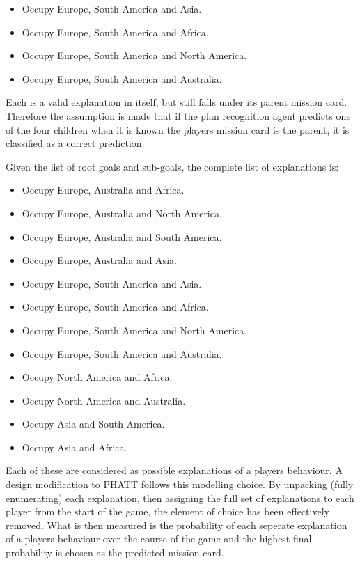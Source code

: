 \documentclass[parskip]{cs4rep}
\begin{document}
\begin{itemize}
\item
Occupy Europe, South America and Asia.
\item
Occupy Europe, South America and Africa.
\item
Occupy Europe, South America and North America.
\item
Occupy Europe, South America and Australia.
\end{itemize}

Each is a valid explanation in itself, but still falls under its parent mission card. Therefore the assumption is made that if the plan recognition agent predicts one of the four children when it is known the players mission card is the parent, it is classified as a correct prediction.

Given the list of root goals and sub-goals, the complete list of explanations is:

\begin{itemize}
\item
Occupy Europe, Australia and Africa.
\item
Occupy Europe, Australia and North America.
\item
Occupy Europe, Australia and South America.
\item
Occupy Europe, Australia and Asia.
\item
Occupy Europe, South America and Asia.
\item
Occupy Europe, South America and Africa.
\item
Occupy Europe, South America and North America.
\item
Occupy Europe, South America and Australia.
\item
Occupy North America and Africa.
\item
Occupy North America and Australia.
\item
Occupy Asia and South America.
\item
Occupy Asia and Africa.
\end{itemize}

Each of these are considered as possible explanations of a players behaviour. A design modification to PHATT follows this modelling choice. By unpacking (fully enumerating) each explanation, then assigning the full set of explanations to each player from the start of the game, the element of choice has been effectively removed. What is then measured is the probability of each seperate explanation of a players behaviour over the course of the game and the highest final probability is chosen as the predicted mission card.
\end{document}
